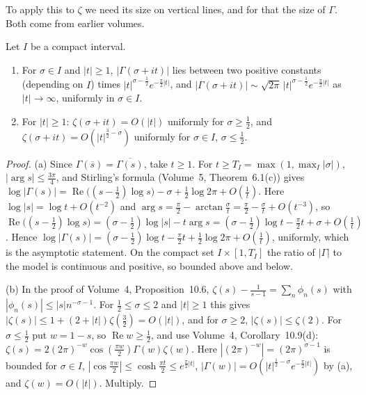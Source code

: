 To apply this to $\zeta$ we need its size on vertical lines, and for that the size of $\Gamma$. Both come from earlier volumes.

\begin{lemma}\label{lem:verticalsizes}
Let $I$ be a compact interval.
\begin{enumerate}
\item[(a)] For $\sigma\in I$ and $|t|\ge1$, $|\Gamma(\sigma+it)|$ lies between two positive constants (depending on $I$) times $|t|^{\sigma-\frac12}e^{-\frac\pi2|t|}$, and
$|\Gamma(\sigma+it)|\sim\sqrt{2\pi}\,|t|^{\sigma-\frac12}e^{-\frac\pi2|t|}$ as $|t|\to\infty$, uniformly in $\sigma\in I$.
\item[(b)] For $|t|\ge1$: $\zeta(\sigma+it)=O(|t|)$ uniformly for $\sigma\ge\frac12$, and $\zeta(\sigma+it)=O(|t|^{\frac32-\sigma})$ uniformly for $\sigma\in I$, $\sigma\le\frac12$.
\end{enumerate}
\end{lemma}
\begin{proof}
(a) Since $\Gamma(\overline s)=\overline{\Gamma(s)}$, take $t\ge1$. For $t\ge T_I=\max(1,\max_I|\sigma|)$, $|\arg s|\le\frac{3\pi}4$, and Stirling's formula (Volume~5, Theorem~6.1(c)) gives
$\log|\Gamma(s)|=\operatorname{Re}\bigl((s-\frac12)\log s\bigr)-\sigma+\frac12\log2\pi+O(\frac1t)$. Here $\log|s|=\log t+O(t^{-2})$ and $\arg s=\frac\pi2-\arctan\frac\sigma t=\frac\pi2-\frac\sigma t+O(t^{-3})$, so
$\operatorname{Re}\bigl((s-\frac12)\log s\bigr)=(\sigma-\frac12)\log|s|-t\arg s=(\sigma-\frac12)\log t-\frac\pi2t+\sigma+O(\frac1t)$. Hence $\log|\Gamma(s)|=(\sigma-\frac12)\log t-\frac\pi2t+\frac12\log2\pi+O(\frac1t)$,
uniformly, which is the asymptotic statement. On the compact set $I\times[1,T_I]$ the ratio of $|\Gamma|$ to the model is continuous and positive, so bounded above and below.

(b) In the proof of Volume~4, Proposition~10.6, $\zeta(s)-\frac1{s-1}=\sum_n\phi_n(s)$ with $|\phi_n(s)|\le|s|n^{-\sigma-1}$. For $\frac12\le\sigma\le2$ and $|t|\ge1$ this gives $|\zeta(s)|\le1+(2+|t|)\zeta(\frac32)=O(|t|)$, and
for $\sigma\ge2$, $|\zeta(s)|\le\zeta(2)$. For $\sigma\le\frac12$ put $w=1-s$, so $\operatorname{Re}w\ge\frac12$, and use Volume~4, Corollary~10.9(d):
$\zeta(s)=2(2\pi)^{-w}\cos(\frac{\pi w}2)\Gamma(w)\zeta(w)$. Here $|(2\pi)^{-w}|=(2\pi)^{\sigma-1}$ is bounded for $\sigma\in I$, $|\cos\frac{\pi w}2|\le\cosh\frac{\pi t}2\le e^{\frac\pi2|t|}$, $|\Gamma(w)|=O(|t|^{\frac12-\sigma}e^{-\frac\pi2|t|})$
by (a), and $\zeta(w)=O(|t|)$. Multiply.
\end{proof}

